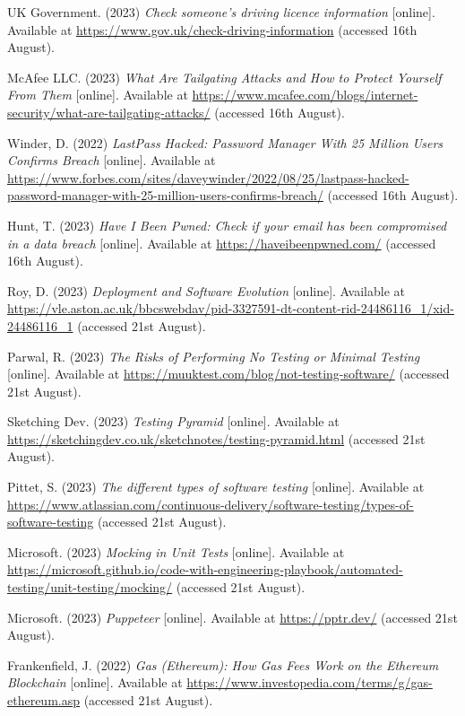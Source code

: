  \noindent [45] UK Government. (2023) \textit{Check someone's driving licence information} [online]. Available at \url{https://www.gov.uk/check-driving-information} (accessed 16th August).
 \vspace{0.2cm}

 \noindent [46] McAfee LLC. (2023) \textit{What Are Tailgating Attacks and How to Protect Yourself From Them} [online]. Available at \url{https://www.mcafee.com/blogs/internet-security/what-are-tailgating-attacks/} (accessed 16th August).
 \vspace{0.2cm}

 \noindent [47] Winder, D. (2022) \textit{LastPass Hacked: Password Manager With 25 Million Users Confirms Breach} [online]. Available at \url{https://www.forbes.com/sites/daveywinder/2022/08/25/lastpass-hacked-password-manager-with-25-million-users-confirms-breach/} (accessed 16th August).
 \vspace{0.2cm}

 \noindent [48] Hunt, T. (2023) \textit{Have I Been Pwned: Check if your email has been compromised in a data breach} [online]. Available at \url{https://haveibeenpwned.com/} (accessed 16th August).
 \vspace{0.2cm}

 \noindent [TODO1] Roy, D. (2023) \textit{Deployment and Software Evolution} [online]. Available at \url{https://vle.aston.ac.uk/bbcswebdav/pid-3327591-dt-content-rid-24486116_1/xid-24486116_1} (accessed 21st August).
 \vspace{0.2cm}

 \noindent [TODO2] Parwal, R. (2023) \textit{The Risks of Performing No Testing or Minimal Testing} [online]. Available at \url{https://muuktest.com/blog/not-testing-software/} (accessed 21st August).
 \vspace{0.2cm}

 \noindent [TODO3] Sketching Dev. (2023) \textit{Testing Pyramid} [online]. Available at \url{https://sketchingdev.co.uk/sketchnotes/testing-pyramid.html} (accessed 21st August).
 \vspace{0.2cm}

 \noindent [TODO4] Pittet, S. (2023) \textit{The different types of software testing} [online]. Available at \url{https://www.atlassian.com/continuous-delivery/software-testing/types-of-software-testing} (accessed 21st August).
 \vspace{0.2cm}

 \noindent [TODO5] Microsoft. (2023) \textit{Mocking in Unit Tests} [online]. Available at \url{https://microsoft.github.io/code-with-engineering-playbook/automated-testing/unit-testing/mocking/} (accessed 21st August).
 \vspace{0.2cm}

 \noindent [TODO6] Microsoft. (2023) \textit{Puppeteer} [online]. Available at \url{https://pptr.dev/} (accessed 21st August).
 \vspace{0.2cm}

 \noindent [TODO7] Frankenfield, J. (2022) \textit{Gas (Ethereum): How Gas Fees Work on the Ethereum Blockchain} [online]. Available at \url{https://www.investopedia.com/terms/g/gas-ethereum.asp} (accessed 21st August).
 \vspace{0.2cm}

\newpage
